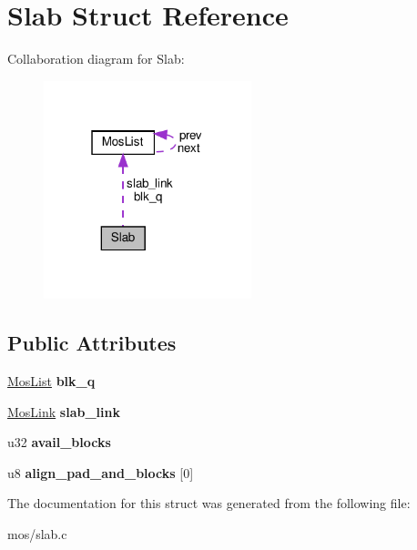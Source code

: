 \hypertarget{structSlab}{}\section{Slab Struct Reference}
\label{structSlab}


Collaboration diagram for Slab\+:\nopagebreak
\begin{figure}[H]
\begin{center}
\leavevmode
\includegraphics[width=171pt]{structSlab__coll__graph}
\end{center}
\end{figure}
\subsection*{Public Attributes}
\begin{DoxyCompactItemize}
\item 
\mbox{\label{structSlab_ab8e004433995ac3d98fe46f0c26d0b15}} 
\hyperlink{structMosList}{Mos\+List} {\bfseries blk\+\_\+q}
\item 
\mbox{\label{structSlab_a894e051abf1550b7cd2d5aba32eb6943}} 
\hyperlink{structMosList}{Mos\+Link} {\bfseries slab\+\_\+link}
\item 
\mbox{\label{structSlab_a2db39ad038c02dc4a7fd2c5bf96efec3}} 
u32 {\bfseries avail\+\_\+blocks}
\item 
\mbox{\label{structSlab_a4d006626ec44ddaa310359b3597b8355}} 
u8 {\bfseries align\+\_\+pad\+\_\+and\+\_\+blocks} \mbox{[}0\mbox{]}
\end{DoxyCompactItemize}


The documentation for this struct was generated from the following file\+:\begin{DoxyCompactItemize}
\item 
mos/slab.\+c\end{DoxyCompactItemize}
